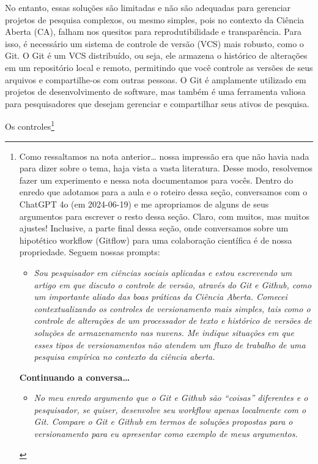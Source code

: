 \documentclass[
  a4paper,
]{book}
\providecommand{\tightlist}{%
  \setlength{\itemsep}{0pt}\setlength{\parskip}{0pt}}\usepackage{longtable,booktabs,array}
\begin{document}
No entanto, essas soluções são limitadas e não são adequadas para
gerenciar projetos de pesquisa complexos, ou mesmo simples, pois no
contexto da Ciência Aberta (CA), falham nos quesitos para
reprodutibilidade e transparência. Para isso, é necessário um sistema de
controle de versão (VCS) mais robusto, como o Git. O Git é um VCS
distribuído, ou seja, ele armazena o histórico de alterações em um
repositório local e remoto, permitindo que você controle as versões de
seus arquivos e compartilhe-os com outras pessoas. O Git é amplamente
utilizado em projetos de desenvolvimento de software, mas também é uma
ferramenta valiosa para pesquisadores que desejam gerenciar e
compartilhar seus ativos de pesquisa.

Os controles\footnote{Como ressaltamos na nota anterior\ldots{} nossa
  impressão era que não havia nada para dizer sobre o tema, haja vista a
  vasta literatura. Desse modo, resolvemos fazer um experimento e nessa
  nota documentamos para vocês. Dentro do enredo que adotamos para a
  aula e o roteiro dessa seção, conversamos com o ChatGPT 4o (em
  2024-06-19) e me apropriamos de alguns de seus argumentos para
  escrever o resto dessa seção. Claro, com muitos, mas muitos ajustes!
  Inclusive, a parte final dessa seção, onde conversamos sobre um
  hipotético workflow (Gitflow) para uma colaboração científica é de
  nossa propriedade. Seguem nossas prompts:

  \begin{itemize}
  \tightlist
  \item
    \emph{Sou pesquisador em ciências sociais aplicadas e estou
    escrevendo um artigo em que discuto o controle de versão, através do
    Git e Github, como um importante aliado das boas práticas da Ciência
    Aberta. Comecei contextualizando os controles de versionamento mais
    simples, tais como o controle de alterações de um processador de
    texto e histórico de versões de soluções de armazenamento nas
    nuvens. Me indique situações em que esses tipos de versionamentos
    não atendem um fluxo de trabalho de uma pesquisa empírica no
    contexto da ciência aberta.}
  \end{itemize}

  \textbf{Continuando a conversa\ldots{}}

  \begin{itemize}
  \tightlist
  \item
    \emph{No meu enredo argumento que o Git e Github são ``coisas''
    diferentes e o pesquisador, se quiser, desenvolve seu workflow
    apenas localmente com o Git. Compare o Git e Github em termos de
    soluções propostas para o versionamento para eu apresentar como
    exemplo de meus argumentos.}
  \end{itemize}

}
\end{document}
